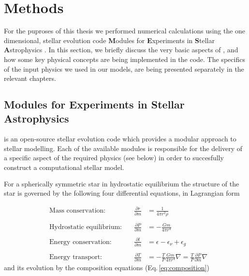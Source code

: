 \documentclass[../../main/thesis_msc.tex]{subfiles}
\begin{document}
    \chapter{Methods}
    
    	For the puproses of this thesis we performed numerical calculations using the one dimensional, stellar evolution code \textbf{M}odules for \textbf{E}xperiments in \textbf{S}tellar \textbf{A}strophysics \citep[\mesa,][]{Paxton2011, Paxton:2013pj, Paxton2015, Paxton2018, Paxton2019}. In this section, we briefly discuss the very basic aspects of \mesa, and how some key physical concepts are being implemented in the code. The specifics of the input physics we used in our models, are being presented separately in the relevant chapters.
    	
    		\section{Modules for Experiments in Stellar Astrophysics}
    		
    			
    			\mesa is an open-source stellar evolution code which provides a modular approach to stellar modelling. Each of the available modules is responsible for the delivery of a specific aspect of the required physics (see below) in order to succesfully construct a computational stellar model.
    			
    			For a spherically symmetric star in hydrostatic equilibrium the structure of the star is governed by the following four differential equations, in Lagrangian form
    			
    			\begin{align} 
    				&\textrm{Mass conservation:} &\quad \frac{\partial r}{\partial m} &= \frac{1}{4 \pi r^2 \rho} \label{eq:2.1} \\ \nonumber \\
					&\textrm{Hydrostatic equilibrium:} &\quad \frac{\partial P}{\partial m} &= - \frac{G m}{4 \pi r^4} \\ \nonumber \\
					&\textrm{Energy conservation:} &\quad \frac{\partial l}{\partial m} &= \epsilon - \epsilon_{\nu} + \epsilon_g \\ \nonumber \\
					&\textrm{Energy transport:} &\quad \frac{\partial T}{\partial m} &= - \frac{T}{P} \frac{G m}{4 \pi r^4} \nabla  = \frac{T}{P} \frac{\partial P}{\partial m} \nabla \label{eq:2.4}
				\end{align}
				and its evolution by the composition equations (Eq.\,\ref{eq:composition})
				
\end{document}
